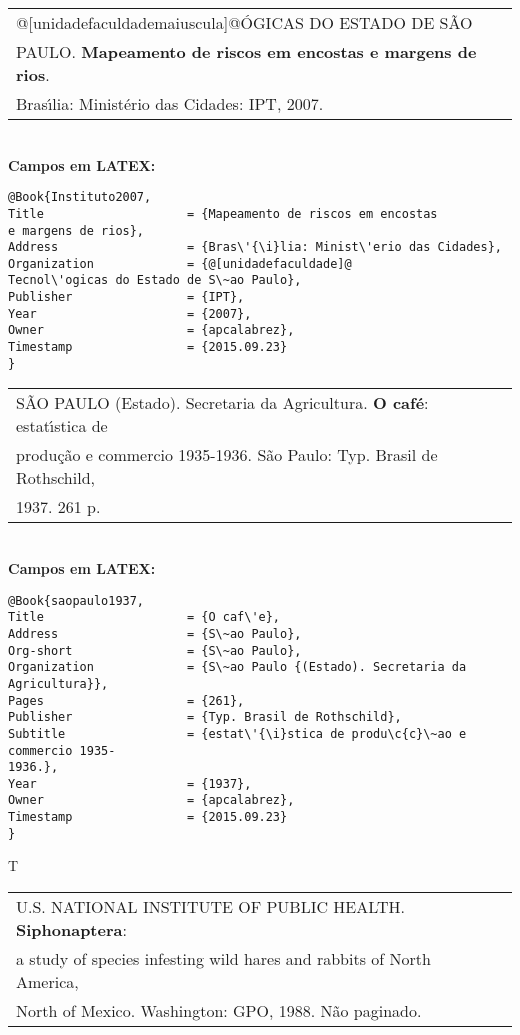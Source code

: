 \begin{tabular}{|l|c|} \hline
	@[unidadefaculdademaiuscula]@\'OGICAS DO ESTADO DE S\~AO \\
	PAULO.  \textbf{Mapeamento de riscos em encostas e margens de rios}. \\ 
	Bras\'{\i}lia: Minist\'erio das Cidades: IPT, 2007.   \\\hline
\end{tabular}\\

\textbf{Campos em LATEX:}

\begin{verbatim}
@Book{Instituto2007,
Title                    = {Mapeamento de riscos em encostas
e margens de rios},
Address                  = {Bras\'{\i}lia: Minist\'erio das Cidades},
Organization             = {@[unidadefaculdade]@
Tecnol\'ogicas do Estado de S\~ao Paulo},
Publisher                = {IPT},
Year                     = {2007},
Owner                    = {apcalabrez},
Timestamp                = {2015.09.23}
}
\end{verbatim}

\begin{tabular}{|l|c|} \hline
	S\~AO PAULO (Estado). Secretaria da Agricultura. \textbf{O caf\'e}: estat\'{\i}stica de \\produ\c{c}\~ao e commercio 1935-1936. S\~ao Paulo: Typ. Brasil de Rothschild, \\1937. 261 p.  \\\hline
\end{tabular}\\

\textbf{Campos em LATEX:}

\begin{verbatim}
@Book{saopaulo1937,
Title                    = {O caf\'e},
Address                  = {S\~ao Paulo},
Org-short                = {S\~ao Paulo},
Organization             = {S\~ao Paulo {(Estado). Secretaria da 
Agricultura}},
Pages                    = {261},
Publisher                = {Typ. Brasil de Rothschild},
Subtitle                 = {estat\'{\i}stica de produ\c{c}\~ao e commercio 1935-
1936.},
Year                     = {1937},
Owner                    = {apcalabrez},
Timestamp                = {2015.09.23}
}
\end{verbatim}
T

\begin{tabular}{|l|c|} \hline
	U.S. NATIONAL INSTITUTE OF PUBLIC HEALTH. \textbf{Siphonaptera}: \\  a study
	of species infesting wild hares and rabbits of North America,\\ North of Mexico. Washington: GPO, 1988. N\~ao paginado.  \\\hline
\end{tabular}\\

